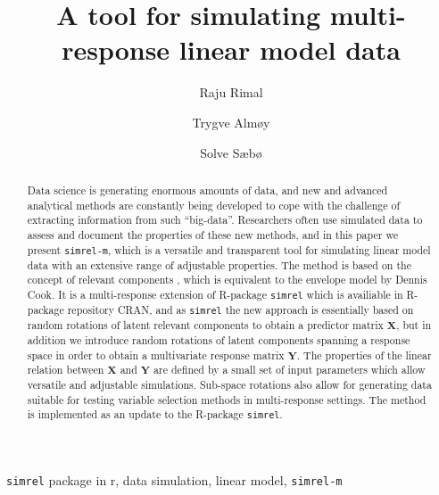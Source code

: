 \documentclass[3p,times,12pt,authoryear]{elsarticle}
\theoremstyle{definition}
\theoremstyle{definition}
\theoremstyle{remark}
\begin{document}
\begin{frontmatter}

  \title{A tool for simulating multi-response linear model data}
  
    \author[KBM]{Raju Rimal}
    \author[KBM]{Trygve Almøy}
  
    \author[NMBU]{Solve Sæbø}
  
      \address[KBM]{Faculty of Chemistry and Bioinformatics, Norwegian University of Life
Sciences, Ås, Norway}
    \address[NMBU]{Prorector, Norwegian University of Life Sciences, Ås, Norway}
  
  \begin{abstract}
  \normalsize Data science is generating enormous amounts of data, and new
  and advanced analytical methods are constantly being developed to cope
  with the challenge of extracting information from such ``big-data''.
  Researchers often use simulated data to assess and document the
  properties of these new methods, and in this paper we present
  \texttt{simrel-m}, which is a versatile and transparent tool for
  simulating linear model data with an extensive range of adjustable
  properties. The method is based on the concept of relevant components
  \citep{helland1994comparison}, which is equivalent to the envelope model
  by Dennis Cook. It is a multi-response extension of R-package
  \texttt{simrel} which is availiable in R-package repository CRAN, and as
  \texttt{simrel} the new approach is essentially based on random
  rotations of latent relevant components to obtain a predictor matrix
  \(\mathbf{X}\), but in addition we introduce random rotations of latent
  components spanning a response space in order to obtain a multivariate
  response matrix \(\mathbf{Y}\). The properties of the linear relation
  between \(\mathbf{X}\) and \(\mathbf{Y}\) are defined by a small set of
  input parameters which allow versatile and adjustable simulations.
  Sub-space rotations also allow for generating data suitable for testing
  variable selection methods in multi-response settings. The method is
  implemented as an update to the R-package \texttt{simrel}.
  \end{abstract}
   \begin{keyword} \texttt{simrel} package in r, data simulation, linear model,
\texttt{simrel-m}\end{keyword}

\end{frontmatter}
\end{document}
